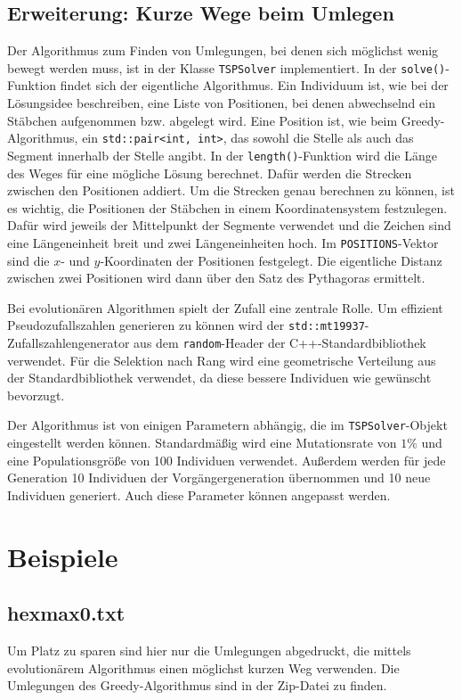 \documentclass[a4paper,10pt,ngerman]{scrartcl}
\begin{document}
\subsection{Erweiterung: Kurze Wege beim Umlegen}
Der Algorithmus zum Finden von Umlegungen, bei denen sich möglichst wenig bewegt werden muss, ist in der Klasse \lstinline{TSPSolver} implementiert. In der \lstinline{solve()}-Funktion findet sich der eigentliche Algorithmus. 
Ein Individuum ist, wie bei der Lösungsidee beschreiben, eine Liste von Positionen, bei denen abwechselnd ein Stäbchen aufgenommen bzw. abgelegt wird. 
Eine Position ist, wie beim Greedy-Algorithmus, ein \lstinline{std::pair<int, int>}, das sowohl die Stelle als auch das Segment innerhalb der Stelle angibt. 
In der \lstinline{length()}-Funktion wird die Länge des Weges für eine mögliche Lösung berechnet. 
Dafür werden die Strecken zwischen den Positionen addiert. 
Um die Strecken genau berechnen zu können, ist es wichtig, die Positionen der Stäbchen in einem Koordinatensystem festzulegen. 
Dafür wird jeweils der Mittelpunkt der Segmente verwendet und die Zeichen sind eine Längeneinheit breit und zwei Längeneinheiten hoch.
Im \lstinline{POSITIONS}-Vektor sind die $x$- und $y$-Koordinaten der Positionen festgelegt. 
Die eigentliche Distanz zwischen zwei Positionen wird dann über den Satz des Pythagoras ermittelt. 

Bei evolutionären Algorithmen spielt der Zufall eine zentrale Rolle. 
Um effizient Pseudozufallszahlen generieren zu können wird der \lstinline{std::mt19937}-Zufallszahlengenerator aus dem \lstinline{random}-Header der C++-Standardbibliothek verwendet. 
Für die Selektion nach Rang wird eine geometrische Verteilung aus der Standardbibliothek verwendet, da diese bessere Individuen wie gewünscht bevorzugt.

Der Algorithmus ist von einigen Parametern abhängig, die im \lstinline{TSPSolver}-Objekt eingestellt werden können. 
Standardmäßig wird eine Mutationsrate von $1\%$ und eine Populationsgröße von 100 Individuen verwendet. 
Außerdem werden für jede Generation 10 Individuen der Vorgängergeneration übernommen und 10 neue Individuen generiert. Auch diese Parameter können angepasst werden. 


\section{Beispiele}
\subsection*{hexmax0.txt}

Um Platz zu sparen sind hier nur die Umlegungen abgedruckt, die mittels evolutionärem Algorithmus einen möglichst kurzen Weg verwenden. Die Umlegungen des Greedy-Algorithmus sind in der Zip-Datei zu finden.
\end{document}
